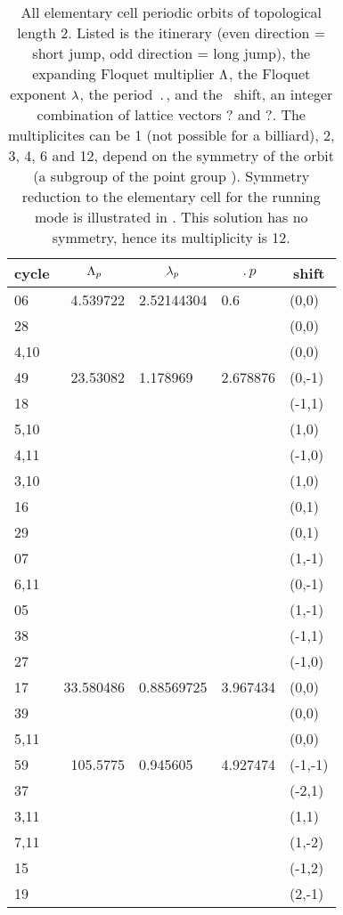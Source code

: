 
\begin{table}
\centering
\caption[]{
All elementary cell periodic orbits of topological length 2. Listed is
the itinerary (even direction = short jump, odd direction = long jump),
the expanding Floquet multiplier $\Lambda$,
the Floquet exponent $\lambda$,
the period $\period{}$,
and
the \rpo\ shift, an integer combination of lattice vectors ? and ?. The
multiplicites can be 1 (not possible for a billiard), 2, 3, 4, 6 and 12,
depend on the symmetry of the orbit (a subgroup of the point group ).
Symmetry reduction to the elementary cell for the running mode 
is illustrated in . This solution has no
symmetry, hence its multiplicity is 12.
    }
    \begin{tabular}{l|r|l|l|l}
    \multicolumn{1}{c}{cycle}
    & \multicolumn{1}{|c|}{$\Lambda_p$}
      & \multicolumn{1}{c|}{$\lambda_p$}
       & \multicolumn{1}{c|}{$\period{p}$}
          & \multicolumn{1}{c}{shift} \\
    \hline
06  & 4.539722 & 2.52144304
                 & 0.6      & (0,0)  \\
28  &          & &          & (0,0)  \\
4,10  &        & &          & (0,0) \\
    \hline
49   & 23.53082 & 1.178969
                 & 2.678876 & (0,-1) \\
18   &         & &          & (-1,1)   \\
5,10 &         & &          & (1,0)  \\
4,11 &         & &          & (-1,0)  \\
3,10 &         & &          & (1,0)  \\
16 &           & &          & (0,1) \\
29 &           & &          & (0,1) \\
07 &           & &          & (1,-1) \\
6,11 &         & &          & (0,-1)  \\
05 &           & &          & (1,-1) \\
38 &           & &          & (-1,1) \\
27 &           & &          & (-1,0)  \\
    \hline
17 & 33.580486 & 0.88569725
                 & 3.967434 & (0,0) \\
39 &           & &          & (0,0) \\
5,11 &         & &          & (0,0) \\
    \hline
59   & 105.5775 & 0.945605
                  &  4.927474 & (-1,-1) \\
37   &          & &         & (-2,1) \\
3,11 &          & &         & (1,1) \\
7,11 &          & &         & (1,-2) \\
15  &           & &         & (-1,2) \\
19   &          & &         & (2,-1) \\
	\hline
    \end{tabular}
\label{tab:ListLength2}
\end{table}
